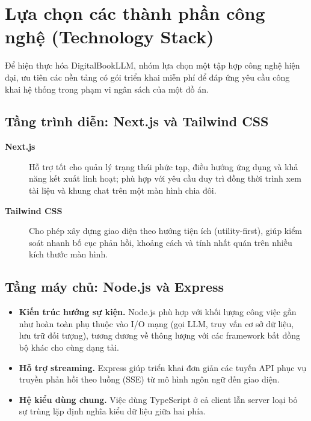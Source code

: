 \section{Lựa chọn các thành phần công nghệ (Technology Stack)}
Để hiện thực hóa DigitalBookLLM, nhóm lựa chọn một tập hợp công nghệ hiện đại, ưu tiên các nền tảng có gói triển khai miễn phí để đáp ứng yêu cầu công khai hệ thống trong phạm vi ngân sách của một đồ án.

\subsection{Tầng trình diễn: Next.js và Tailwind CSS}
\begin{description}
    \item[\textbf{Next.js}] Hỗ trợ tốt cho quản lý trạng thái phức tạp, điều hướng ứng dụng và khả năng kết xuất linh hoạt; phù hợp với yêu cầu duy trì đồng thời trình xem tài liệu và khung chat trên một màn hình chia đôi.
    \item[\textbf{Tailwind CSS}] Cho phép xây dựng giao diện theo hướng tiện ích (utility-first), giúp kiểm soát nhanh bố cục phản hồi, khoảng cách và tính nhất quán trên nhiều kích thước màn hình.
\end{description}

\subsection{Tầng máy chủ: Node.js và Express}
\begin{itemize}
    \item \textbf{Kiến trúc hướng sự kiện.} Node.js phù hợp với khối lượng công việc gần như hoàn toàn phụ thuộc vào I/O mạng (gọi LLM, truy vấn cơ sở dữ liệu, lưu trữ đối tượng), tương đương về thông lượng với các framework bất đồng bộ khác cho cùng dạng tải.
    \item \textbf{Hỗ trợ streaming.} Express giúp triển khai đơn giản các tuyến API phục vụ truyền phản hồi theo luồng (SSE) từ mô hình ngôn ngữ đến giao diện.
    \item \textbf{Hệ kiểu dùng chung.} Việc dùng TypeScript ở cả client lẫn server loại bỏ sự trùng lặp định nghĩa kiểu dữ liệu giữa hai phía.
\end{itemize}

